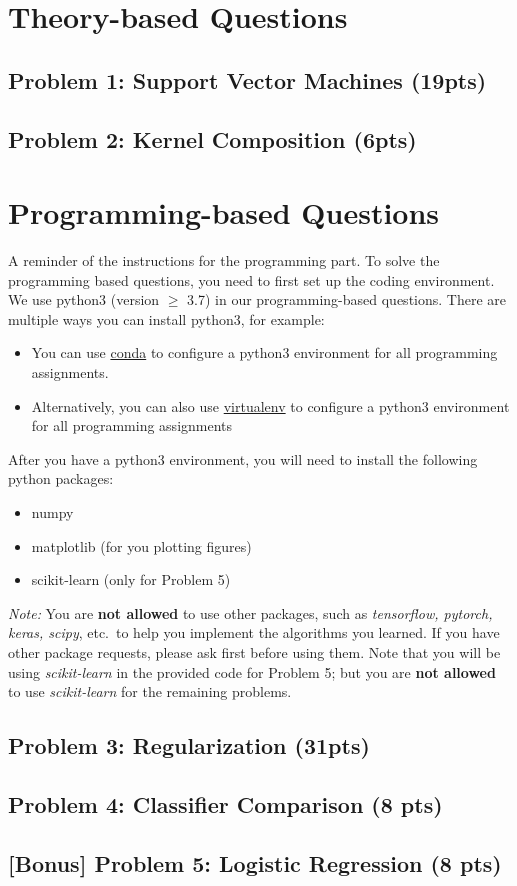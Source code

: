 \documentclass{article}
\newcommand{\blue}[1]{{\color{blue}#1}}
\newcommand{\pink}[1]{{\color{magenta}#1}}
\begin{document}
\newpage
\section*{Theory-based Questions}

\subsection*{Problem 1: Support Vector Machines (\blue{19pts})}
    
\subsection*{Problem 2: Kernel Composition (\blue{6pts})}
    

\clearpage

\section*{Programming-based Questions}


A reminder of the instructions for the programming part. To solve the programming based questions, you need to first set up the coding environment. We use python3 (version $\geq$ 3.7) in our programming-based questions. There are multiple ways you can install python3, for example:
\begin{itemize}[topsep=5pt, itemsep=-2pt]
    \item You can use \href{https://docs.conda.io/en/latest/}{\pink{conda}} to configure a python3 environment for all programming assignments.
    \item Alternatively, you can also use \href{https://virtualenv.pypa.io/en/stable/}{\pink{virtualenv}} to configure a python3 environment for all programming assignments
\end{itemize}

\noindent After you have a python3 environment, you will need to install the following python packages:
\begin{itemize}[topsep=5pt, itemsep=-2pt]
    \item numpy
    \item matplotlib (for you plotting figures)
    \item scikit-learn (only for Problem 5)
\end{itemize}

\emph{Note:} You are \textbf{not allowed} to use other packages, such as \emph{tensorflow, pytorch, keras, scipy}, etc.\ to help you implement the algorithms you learned. If you have other package requests, please ask first before using them. Note that you will be using  \emph{scikit-learn} in the provided code for Problem 5; but you are \textbf{not allowed} to use \emph{scikit-learn} for the remaining problems.

\subsection*{Problem 3: Regularization (\blue{31pts})}
    
\subsection*{Problem 4: Classifier Comparison (\blue{8 pts})}
    
\subsection*{[Bonus] Problem 5: Logistic Regression (\blue{8 pts})}
    
\end{document}
